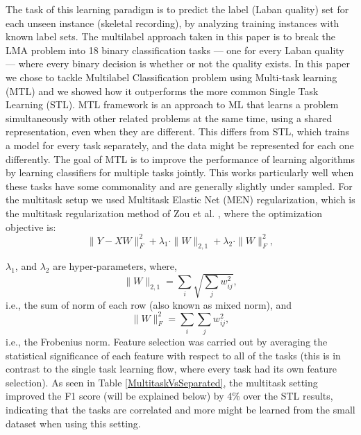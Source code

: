 \documentclass{sigchi}
\begin{document}
The task of this learning paradigm is to predict
the label (Laban quality) set for each unseen instance (skeletal recording), 
by analyzing training instances with known label sets. The multilabel
approach taken in this paper is to break the LMA problem into 18
binary classification tasks --- one for every Laban quality --- where every binary
decision is whether or not the quality exists. 
In this paper we chose to tackle Multilabel Classification problem using
Multi-task learning (MTL) and we showed how it outperforms the more common
Single Task Learning (STL).
MTL framework \cite{caruana1997multitask} is an approach to ML that learns a problem simultaneously with other related problems at the same time, using a shared representation, even when they are different. This differs from STL, which trains a model for every task separately, and the data might be represented for each one differently.
The goal of MTL is to improve the performance of learning algorithms by learning classifiers for multiple tasks jointly. This works particularly well when these tasks have some commonality and are generally slightly under sampled.
For the multitask setup we used Multitask Elastic Net (MEN) regularization, which is the multitask regularization method of Zou et al. \cite{Zou}, where the optimization objective is:
\\
\begin{equation}\label{eq:MEN}
\|Y - XW\|^2_F+\lambda_1\cdot\|W\|_{2,1}+\lambda_2\cdot\|W\|^2_F,
\end{equation}

$\lambda_1$, and $\lambda_2$ are hyper-parameters, where,
\\
\begin{equation*}
\|W\|_{2,1} = \sum_i \sqrt{\sum_j w_{ij}^2},
\end{equation*}
i.e., the sum of norm of each row (also known as mixed norm), and
\begin{equation*}
\|W\|^2_F = \sum_i{\sum_j w_{ij}^2},
\end{equation*}
i.e., the Frobenius norm.
Feature selection was carried out by averaging the statistical significance of
each feature with respect to all of the tasks (this is in contrast to the single
task learning flow, where every task had its own feature selection). As seen in
Table \ref{MultitaskVsSeparated}, the multitask setting improved the F1 score (will be explained below) by 4\% over the STL results, indicating that the tasks are correlated and more might be learned from the small dataset when using this setting.
\end{document}
